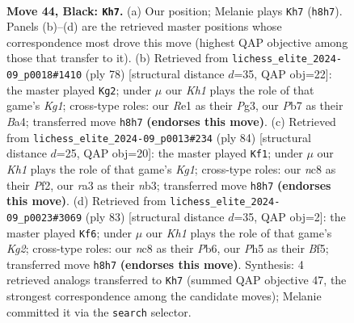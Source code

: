 \documentclass[11pt]{article}
\begin{document}
\clearpage

\begin{figure}[p]\centering
\begin{subfigure}{0.46\textwidth}\centering
\resizebox{\linewidth}{!}{%
\newchessgame
\chessboard[
  setfen={2N4k/1p4b1/6p1/5p1p/Pr6/R5PP/5PK1/4r3 b - - 4 44},
  showmover=false,
  pgfstyle=straightmove, color=movearrow, markmove={h8-h7}
]}
\caption{}
\end{subfigure}\hfill
\begin{subfigure}{0.46\textwidth}\centering
\resizebox{\linewidth}{!}{%
\newchessgame
\chessboard[
  setfen={8/1r4k1/3r2pp/5p2/B1Rp3P/3P2P1/5P2/6K1 w - - 0 40},
  showmover=false,
  pgfstyle=straightmove, color=movearrow, markmove={g1-g2}
]}
\caption{}
\end{subfigure}
\\[4pt]
\begin{subfigure}{0.46\textwidth}\centering
\resizebox{\linewidth}{!}{%
\newchessgame
\chessboard[
  setfen={3r4/r4pk1/2B4p/3P2pP/4R3/1n6/3p1PP1/3R2K1 w - - 4 43},
  showmover=false,
  pgfstyle=straightmove, color=movearrow, markmove={g1-f1}
]}
\caption{}
\end{subfigure}\hfill
\begin{subfigure}{0.46\textwidth}\centering
\resizebox{\linewidth}{!}{%
\newchessgame
\chessboard[
  setfen={8/6k1/1p4p1/5b1p/p1r4P/P4PP1/1P1RNK2/8 b - - 1 42},
  showmover=false,
  pgfstyle=straightmove, color=movearrow, markmove={g7-f6}
]}
\caption{}
\end{subfigure}
\caption{\textbf{Move 44, Black: \texttt{Kh7}.} (a) Our position; Melanie plays \texttt{Kh7} (\texttt{h8h7}). Panels (b)--(d) are the retrieved master positions whose correspondence most drove this move (highest QAP objective among those that transfer to it). (b) Retrieved from \texttt{lichess\_elite\_2024-09\_p0018\#1410} (ply 78) [structural distance $d$=35, QAP obj=22]: the master played \texttt{Kg2}; under $\mu$ our \emph{Kh1} plays the role of that game's \emph{Kg1}; cross-type roles: our \emph{R}e1 as their \emph{P}g3, our \emph{P}b7 as their \emph{B}a4; transferred move \texttt{h8h7} \textbf{(endorses this move)}. (c) Retrieved from \texttt{lichess\_elite\_2024-09\_p0013\#234} (ply 84) [structural distance $d$=25, QAP obj=20]: the master played \texttt{Kf1}; under $\mu$ our \emph{Kh1} plays the role of that game's \emph{Kg1}; cross-type roles: our \emph{n}c8 as their \emph{P}f2, our \emph{r}a3 as their \emph{n}b3; transferred move \texttt{h8h7} \textbf{(endorses this move)}. (d) Retrieved from \texttt{lichess\_elite\_2024-09\_p0023\#3069} (ply 83) [structural distance $d$=35, QAP obj=2]: the master played \texttt{Kf6}; under $\mu$ our \emph{Kh1} plays the role of that game's \emph{Kg2}; cross-type roles: our \emph{n}c8 as their \emph{P}b6, our \emph{P}h5 as their \emph{B}f5; transferred move \texttt{h8h7} \textbf{(endorses this move)}. Synthesis: 4 retrieved analogs transferred to \texttt{Kh7} (summed QAP objective 47, the strongest correspondence among the candidate moves); Melanie committed it via the \texttt{search} selector.}
\label{fig:thought-m87}
\end{figure}
\end{document}
